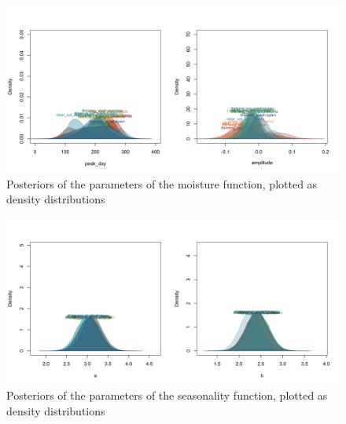 \documentclass[
]{article}
\begin{document}
\begin{figure}
\centering
\includegraphics{../Figures/posteriors_seasonality.png}
\caption{Posteriors of the parameters of the moisture function, plotted as density distributions}
\end{figure}

\begin{figure}
\centering
\includegraphics{../Figures/posteriors_moisture.png}
\caption{Posteriors of the parameters of the seasonality function, plotted as density distributions}
\end{figure}
\end{document}
